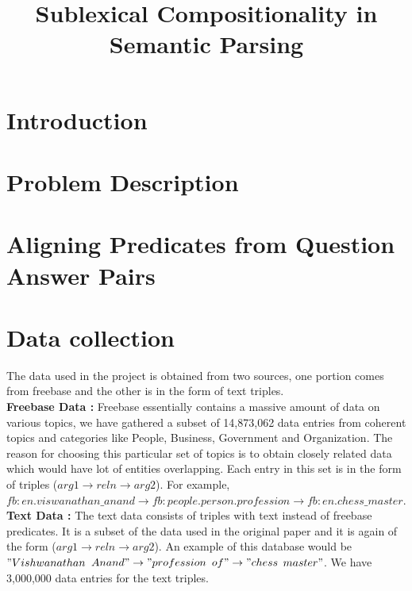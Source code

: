 \documentclass[12pt, a4paper]{article}
\title{Sublexical Compositionality in Semantic Parsing}
\begin{document}
\maketitle

\section{Introduction}

\section{Problem Description}

\section{Aligning Predicates from Question Answer Pairs}



\section{Data collection}
The data used in the project is obtained from two sources, one portion comes from freebase and the other is in the form of text triples.\\

{\bf Freebase Data : }Freebase essentially contains a massive amount of data on various topics, we have gathered a subset of 14,873,062 data entries from coherent topics and categories like People, Business, Government and Organization. The reason for choosing this particular set of topics is to obtain closely related data which would have lot of entities overlapping. Each entry in this set is in the form of triples ($arg1\rightarrow reln \rightarrow arg2$). For example, $fb:en.viswanathan\_anand \rightarrow	fb:people.person.profession \rightarrow	fb:en.chess\_master$. \\

{\bf Text Data : }The text data consists of triples with text instead of freebase predicates. It is a subset of the data used in the original paper and it is again of the form ($arg1\rightarrow reln \rightarrow arg2$). An example of this database would be $"Vishwanathan$ $Anand" \rightarrow "profession$ $of" \rightarrow "chess$ $master"$. We have 3,000,000 data entries for the text triples.\\
\end{document}
